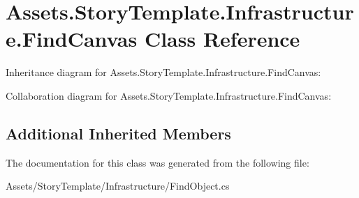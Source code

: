 \hypertarget{classAssets_1_1StoryTemplate_1_1Infrastructure_1_1FindCanvas}{}\section{Assets.\+Story\+Template.\+Infrastructure.\+Find\+Canvas Class Reference}
\label{classAssets_1_1StoryTemplate_1_1Infrastructure_1_1FindCanvas}


Inheritance diagram for Assets.\+Story\+Template.\+Infrastructure.\+Find\+Canvas\+:


Collaboration diagram for Assets.\+Story\+Template.\+Infrastructure.\+Find\+Canvas\+:
\subsection*{Additional Inherited Members}


The documentation for this class was generated from the following file\+:\begin{DoxyCompactItemize}
\item 
Assets/\+Story\+Template/\+Infrastructure/Find\+Object.\+cs\end{DoxyCompactItemize}
